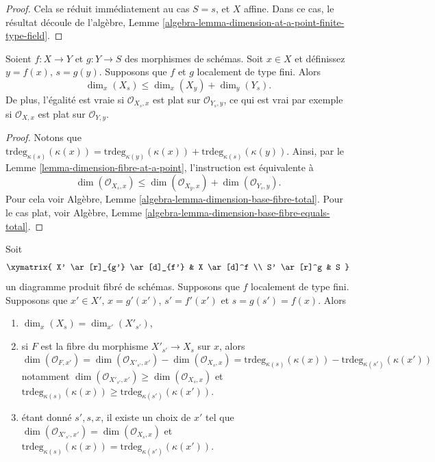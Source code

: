 \begin{proof}
Cela se réduit immédiatement au cas $S = s$, et
$X$ affine. Dans ce
cas, le résultat découle de l'algèbre, Lemme \ref{algebra-lemma-dimension-at-a-point-finite-type-field}.
\end{proof}

\begin{lemma}
\label{lemma-dimension-fibre-at-a-point-additive}
Soient $f : X \to Y$ et $g : Y \to S$ des morphismes de schémas. Soit $x \in X$
et définissez $y = f(x)$, $s = g(y)$. Supposons que $f$
et $g$ localement de type fini.
Alors
$$
\dim_x(X_s) \leq \dim_x(X_y) + \dim_y(Y_s).
$$
De plus, l'égalité est vraie si $\mathcal{O}_{X_s, x}$ est
plat sur $\mathcal{O}_{Y_s, y}$, ce qui est vrai par exemple si $\mathcal{O}_{X, x}$
est plat sur $\mathcal{O}_{Y, y}$.
\end{lemma}

\begin{proof}
Notons que $\text{trdeg}_{\kappa(s)}(\kappa(x)) =
\text{trdeg}_{\kappa(y)}(\kappa(x)) + \text{trdeg}_{\kappa(s)}(\kappa(y))$. Ainsi, par le Lemme \ref{lemma-dimension-fibre-at-a-point},
l'instruction est équivalente
à
$$
\dim(\mathcal{O}_{X_s, x})
\leq
\dim(\mathcal{O}_{X_y, x}) + \dim(\mathcal{O}_{Y_s, y}).
$$
Pour cela voir Algèbre, Lemme \ref{algebra-lemma-dimension-base-fibre-total}.
Pour le cas
plat, voir Algèbre, Lemme \ref{algebra-lemma-dimension-base-fibre-equals-total}.
\end{proof}

\begin{lemma}
\label{lemma-dimension-fibre-after-base-change}
Soit
$$
\xymatrix{
X' \ar[r]_{g'} \ar[d]_{f'} & X \ar[d]^f \\
S' \ar[r]^g & S
}
$$
un diagramme produit fibré de schémas. Supposons que $f$ localement de
type fini. Supposons que $x' \in X'$, $x = g'(x')$, $s' = f'(x')$
et $s = g(s') = f(x)$. Alors
\begin{enumerate}
\item $\dim_x(X_s) = \dim_{x'}(X'_{s'})$,
\item si $F$ est la fibre du morphisme $X'_{s'} \to X_s$ sur $x$,
alors
$$
\dim(\mathcal{O}_{F, x'}) =
\dim(\mathcal{O}_{X'_{s'}, x'}) - \dim(\mathcal{O}_{X_s, x}) =
\text{trdeg}_{\kappa(s)}(\kappa(x)) -
\text{trdeg}_{\kappa(s')}(\kappa(x'))
$$
notamment $\dim(\mathcal{O}_{X'_{s'}, x'}) \geq \dim(\mathcal{O}_{X_s, x})$
et $\text{trdeg}_{\kappa(s)}(\kappa(x)) \geq
\text{trdeg}_{\kappa(s')}(\kappa(x'))$.
\item étant donné $s', s, x$,
il existe un choix de $x'$
tel que $\dim(\mathcal{O}_{X'_{s'}, x'}) = \dim(\mathcal{O}_{X_s, x})$ et $\text{trdeg}_{\kappa(s)}(\kappa(x)) = \text{trdeg}_{\kappa(s')}(\kappa(x'))$.
\end{enumerate}
\end{lemma}

